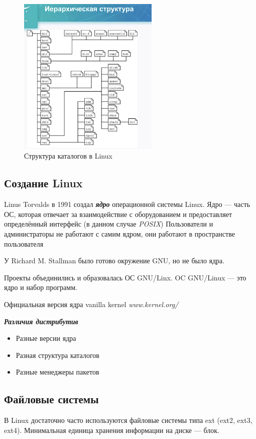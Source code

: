 \documentclass[oneside, final, 14pt]{extreport} %
\begin{document}
\begin{figure}[ht]
    \centering
    \includegraphics[width=0.6\textwidth]{4.png}
    \caption{Структура каталогов в Linux}
    \label{fig:4}
\end{figure}

\subsection{Создание Linux}
Linus Torvalds в 1991 создал \textit{\textbf{ядро}} операционной системы Linux.
Ядро --- часть ОС, которая отвечает за взаимодействие с оборудованием и предоставляет
определённый интерфейс (в данном случае \textit{POSIX})
Пользователи и администраторы не работают с самим ядром, они работают в пространстве пользователя

У Richard M. Stallman было готово окружение GNU, но не было ядра. 

Проекты объединились и образовалась ОС GNU/Linx. 
OC GNU/Linux --- это ядро и набор программ. 

Официальная версия ядра vanilla kernel \textit{www.kernel.org/}

\vspace{\baselineskip}
\textit{\textbf{Различия дистрибутив}}
\begin{itemize}
    \item Разные версии ядра
    \item Разная структура каталогов
    \item Разные менеджеры пакетов
\end{itemize}


\subsection{Файловые системы}
В Linux достаточно часто используются файловые системы типа ext (ext2, ext3, ext4).
Минимальная единица хранения информации на диске --- блок. 
\end{document}
